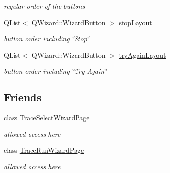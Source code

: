 \begin{CompactItemize}
\begin{CompactList}\small\item\em regular order of the buttons \item\end{CompactList}\item 
\hypertarget{classIXmapsWizard_a0ab75eb5719fee6497c445f33b84105}{
QList$<$ QWizard::WizardButton $>$ \hyperlink{classIXmapsWizard_a0ab75eb5719fee6497c445f33b84105}{stopLayout}}
\label{classIXmapsWizard_a0ab75eb5719fee6497c445f33b84105}

\begin{CompactList}\small\item\em button order including \char`\"{}Stop\char`\"{} \item\end{CompactList}\item 
\hypertarget{classIXmapsWizard_72ab3e6fe33ac5151528bef223967849}{
QList$<$ QWizard::WizardButton $>$ \hyperlink{classIXmapsWizard_72ab3e6fe33ac5151528bef223967849}{tryAgainLayout}}
\label{classIXmapsWizard_72ab3e6fe33ac5151528bef223967849}

\begin{CompactList}\small\item\em button order including \char`\"{}Try Again\char`\"{} \item\end{CompactList}\end{CompactItemize}
\subsection*{Friends}
\begin{CompactItemize}
\item 
\hypertarget{classIXmapsWizard_1f0f2195d2c6a47ef44d96a05b278980}{
class \hyperlink{classIXmapsWizard_1f0f2195d2c6a47ef44d96a05b278980}{TraceSelectWizardPage}}
\label{classIXmapsWizard_1f0f2195d2c6a47ef44d96a05b278980}

\begin{CompactList}\small\item\em allowed access here \item\end{CompactList}\item 
\hypertarget{classIXmapsWizard_50d8c93f451b6845ed811e34c1ee8588}{
class \hyperlink{classIXmapsWizard_50d8c93f451b6845ed811e34c1ee8588}{TraceRunWizardPage}}
\label{classIXmapsWizard_50d8c93f451b6845ed811e34c1ee8588}

\begin{CompactList}\small\item\em allowed access here \item\end{CompactList}\end{CompactItemize}



